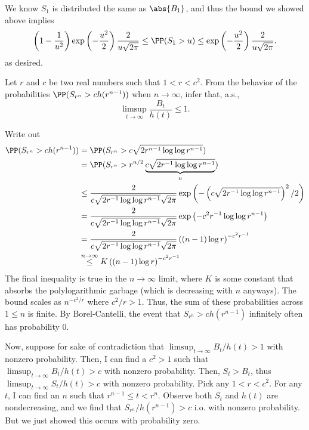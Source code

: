 \documentclass{scrartcl}
\begin{document}
We know $S_1$ is distributed the same as $\abs{B_1}$, and thus the bound we showed above implies
\[
    \left(1 - \frac{1}{u^2}\right)\exp\left(-\frac{u^2}{2}\right)\frac{2}{u\sqrt{2\pi}} \leq \PP(S_1 > u) \leq \exp\left(-\frac{u^2}{2}\right)\frac{2}{u\sqrt{2\pi}}.
\]
as desired.

\begin{prob}
    Let $r$ and $c$ be two real numbers such that $1 < r < c^2$. From the behavior of the probabilities $\PP(S_{r^n} > c h(r^{n-1}))$ when $n \to \infty$, infer that, a.s.,
    \[
        \limsup_{t \to \infty} \frac{B_t}{h(t)} \leq 1.
    \]
\end{prob}

Write out
\begin{align*}
    \PP(S_{r^n} > c h(r^{n-1})) &= \PP(S_{r^n} > c \sqrt{2r^{n-1}\log\log r^{n-1}}) \\
    &= \PP(S_{r^n} >  r^{n/2} \underbrace{c\sqrt{2r^{-1}\log\log r^{n-1}}}_u) \\
    &\leq \frac{2}{c\sqrt{2r^{-1}\log\log r^{n-1}} \sqrt{2\pi}} \exp\left(-\left(c\sqrt{2r^{-1}\log\log r^{n-1}}\right)^2/2\right)\\
    &= \frac{2}{c\sqrt{2r^{-1}\log\log r^{n-1}} \sqrt{2\pi}} \exp\left(-c^2 r^{-1} \log \log r^{n-1}\right)\\
    &= \frac{2}{c\sqrt{2r^{-1}\log\log r^{n-1}} \sqrt{2\pi}} \left((n-1)\log r\right)^{-c^2 r^{-1}}\\
    &\stackrel{n\to \infty}{\leq} K \left((n-1)\log r\right)^{-c^2 r^{-1}}\\
\end{align*}
The final inequality is true in the $n\to\infty$ limit, where $K$ is some constant that absorbs the polylogarithmic garbage (which is decreasing with $n$ anyways). The bound scales as $n^{-c^2 / r}$ where $c^2 / r > 1$. Thus, the sum of these probabilities across $1\leq n$ is finite. By Borel-Cantelli, the event that $S_{r^n} > ch(r^{n-1})$ infinitely often has probability $0$.

Now, suppose for sake of contradiction that $\limsup_{t\to \infty} B_t/h(t) > 1$ with nonzero probability. Then, I can find a $c^2 > 1$ such that $\limsup_{t\to \infty} B_t/h(t) > c$ with nonzero probability. Then, $S_t > B_t$, thus $\limsup_{t\to \infty} S_t / h(t) > c$ with nonzero probability. Pick any $1 < r < c^2$. For any $t$, I can find an $n$ such that $r^{n-1} \leq t < r^n$. Observe both $S_t$ and $h(t)$ are nondecreasing, and we find that $S_{r^n} / h(r^{n-1}) > c$ i.o. with nonzero probability. But we just showed this occurs with probability zero.
\end{document}
